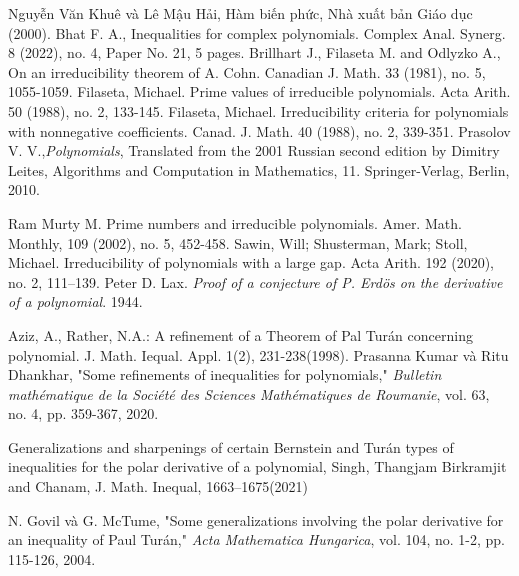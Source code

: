 \documentclass[a5paper,12pt]{report}
\theoremstyle{definition}
\numberwithin{equation}{chapter}
\begin{document}
	
	\begin{thebibliography}{300}
		 Nguyễn Văn Khuê và Lê Mậu Hải, Hàm biến phức, Nhà xuất bản Giáo dục (2000).
		 Bhat F. A., Inequalities for complex polynomials. Complex Anal. Synerg. 8 (2022), no. 4, Paper No. 21, 5 pages.
		 Brillhart J., Filaseta M. and Odlyzko A., On an irreducibility theorem of A. Cohn. Canadian J. Math. 33 (1981), no. 5, 1055-1059.
		  Filaseta, Michael. Prime values of irreducible polynomials. Acta Arith. 50 (1988), no. 2, 133-145.
		  Filaseta, Michael. Irreducibility criteria for polynomials with nonnegative coefficients. Canad. J. Math. 40 (1988), no. 2, 339-351.
		  Prasolov V. V.,{\it  Polynomials}, Translated from the 2001 Russian second edition by Dimitry Leites, Algorithms and Computation in Mathematics, 11. Springer-Verlag, Berlin, 2010.
		
		  Ram Murty M. Prime numbers and irreducible polynomials. Amer. Math. Monthly, 109 (2002), no. 5, 452-458.
		 Sawin, Will; Shusterman, Mark; Stoll, Michael. Irreducibility of polynomials with a large gap. Acta Arith. 192 (2020), no. 2, 111--139.
		Peter D. Lax.
		\textit{Proof of a conjecture of P. Erd{\"o}s on the derivative of a polynomial}.
		1944.
		
		 Aziz, A., Rather, N.A.: A refinement of a Theorem of Pal Turán concerning polynomial. J. Math. Iequal. Appl. 1(2), 231-238(1998).
		Prasanna Kumar và Ritu Dhankhar, "Some refinements of inequalities for polynomials," \textit{Bulletin mathématique de la Société des Sciences Mathématiques de Roumanie}, vol. 63, no. 4, pp. 359-367, 2020.
		
		 Generalizations and sharpenings of certain Bernstein and Turán types of inequalities for the polar derivative of a polynomial, Singh, Thangjam Birkramjit and Chanam, J. Math. Inequal, 1663--1675(2021)
		
		N. Govil và G. McTume, "Some generalizations involving the polar derivative for an inequality of Paul Turán," \textit{Acta Mathematica Hungarica}, vol. 104, no. 1-2, pp. 115-126, 2004.
		
	\end{thebibliography}
	
\end{document}
